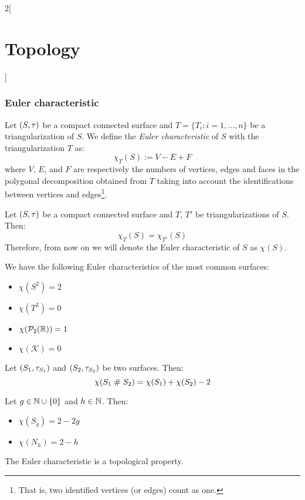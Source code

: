 \documentclass[../../../main.tex]{subfiles}
\begin{document}
\begin{multicols}{2}[\section{Topology}]
  \subsubsection{Euler characteristic}
  \begin{definition}
    Let $(S,\tau)$ be a compact connected surface and $T=\{T_i:i=1,\ldots,n\}$ be a triangularization of $S$. We define the \emph{Euler characteristic} of $S$ with the triangularization $T$ as: $$\chi_T(S):=V-E+F$$ where $V$, $E$, and $F$ are respectively the numbers of vertices, edges and faces in the polygonal decomposition obtained from $T$ taking into account the identifications between vertices and edges\footnote{That is, two identified vertices (or edges) count as one.}.
  \end{definition}
  \begin{prop}
    Let $(S,\tau)$ be a compact connected surface and $T$, $T'$ be triangularizations of $S$. Then: $$\chi_T(S)=\chi_{T'}(S)$$ Therefore, from now on we will denote the Euler characteristic of $S$ as $\chi(S)$.
  \end{prop}
  \begin{prop}
    We have the following Euler characteristics of the most common surfaces:
    \begin{itemize}
      \item $\chi(S^2)=2$
      \item $\chi(T^2)=0$
      \item $\chi(\mathcal{P}_2(\mathbb{R}))=1$
      \item $\chi(\mathcal{K})=0$
    \end{itemize}
  \end{prop}
  \begin{prop}
    Let $(S_1,\tau_{S_1})$ and $(S_2,\tau_{S_2})$ be two surfaces. Then: $$\chi(S_1\mathrel{\#} S_2)=\chi(S_1)+\chi(S_2)-2$$
  \end{prop}
  \begin{corollary}
    Let $g\in\mathbb{N}\cup\{0\}$ and $h\in\mathbb{N}$. Then:
    \begin{itemize}
      \item $\chi(S_g)=2-2g$
      \item $\chi(N_h)=2-h$
    \end{itemize}
  \end{corollary}
  \begin{theorem}
    The Euler characteristic is a topological property.
  \end{theorem}
  \begin{theorem}

\end{theorem}
\end{multicols}
\end{document}
